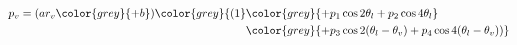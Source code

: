 \begin{align}
p_v=(ar_v\color{grey}{+b})\color{grey}{(1}&\color{grey}{+  p_1\cos 2\theta_l + p_2\cos 4\theta_l } \\
                                           & \color{grey}{+p_3\cos 2(\theta_l-\theta_v) + p_4\cos 4(\theta_l-\theta_v))}
\end{align}

